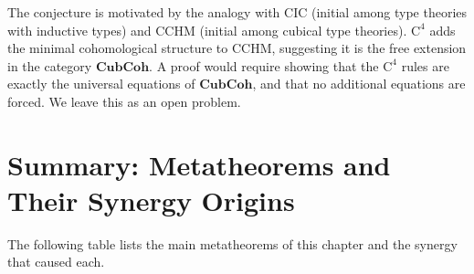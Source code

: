 \begin{remark}
The conjecture is motivated by the analogy with CIC (initial among
type theories with inductive types) and CCHM (initial among cubical
type theories).  $\mathrm{C}^4$ adds the minimal cohomological
structure to CCHM, suggesting it is the free extension in the category
$\mathbf{CubCoh}$.  A proof would require showing that the $\mathrm{C}^4$
rules are exactly the universal equations of $\mathbf{CubCoh}$, and that
no additional equations are forced.  We leave this as an open problem.
\end{remark}


\section{Summary: Metatheorems and Their Synergy Origins}
\label{sec:metatheory-summary}

The following table lists the main metatheorems of this chapter
and the synergy that caused each.

